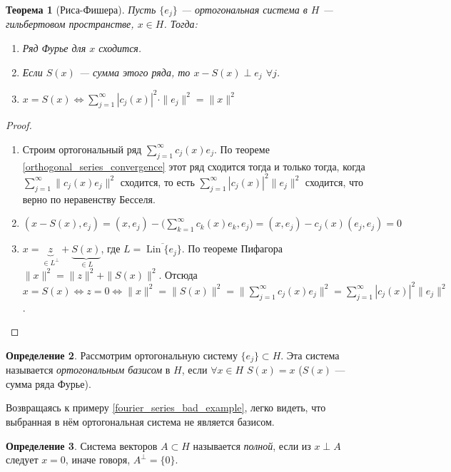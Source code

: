 \documentclass[11pt,openany,a4paper]{scrartcl}
\theoremstyle{plain}
\newtheorem{theorem}{Теорема}[subsection]
\theoremstyle{definition}
\newtheorem{definition}[theorem]{Определение}
\newcommand\ol{\overline}
\DeclareMathOperator{\Lin}{Lin}
\begin{document}
\begin{theorem}[Риса-Фишера]
    Пусть $\{e_j\}$ — ортогональная система в $H$ — гильбертовом пространстве,
    $x \in H$. Тогда:
    \begin{enumerate}
        \item Ряд Фурье для $x$ сходится.
        \item Если $S(x)$ — сумма этого ряда, то $x - S(x) \perp e_j$ $\forall j$.
        \item $x = S(x) \iff \sum\limits_{j=1}^\infty |c_j(x)|^2\cdot\|e_j\|^2 =
        \|x\|^2$
    \end{enumerate}
\end{theorem}
\begin{proof}
    \begin{enumerate}
        \item Строим ортогональный ряд $\sum\limits_{j=1}^\infty c_j(x)e_j$. По 
        теореме \ref{orthogonal_series_convergence} этот ряд сходится тогда и 
        только тогда, когда $\sum\limits_{j=1}^\infty \|c_j(x)e_j\|^2$
        сходится, то 
        есть $\sum\limits_{j=1}^\infty |c_j(x)|^2\|e_j\|^2$ сходится, что верно по 
        неравенству Бесселя.
        \item $(x - S(x), e_j) = (x, e_j) -
        \bigg(\sum\limits_{k=1}^\infty c_k(x)e_k, e_j\bigg) = (x, e_j) - c_j(x)(e_j, e_j) = 
        0$
        \item $x = \underbrace{z}_{\in L^\perp} + \underbrace{S(x)}_{\in L}$, где
        $L = \ol{\Lin\{e_j\}}$. По теореме Пифагора
        $\|x\|^2 = \|z\|^2 + \|S(x)\|^2$. Отсюда $x = S(x) \iff z = 0 \iff
        \|x\|^2 = \|S(x)\|^2 = \bigg\|\sum\limits_{j=1}^\infty c_j(x) e_j\bigg\|^2 =
        \sum\limits_{j=1}^\infty |c_j(x)|^2\|e_j\|^2$.
    \end{enumerate}
\end{proof}

\begin{definition}
    Рассмотрим ортогональную систему $\{e_j\} \subset H$. Эта система называется
    \emph{ортогональным базисом} в $H$, если $\forall x \in H$ $S(x) = x$ ($S(x)$ —
    сумма ряда Фурье).
\end{definition}

Возвращаясь к примеру \ref{fourier_series_bad_example}, легко видеть, что 
выбранная в нём ортогональная система не является базисом.

\begin{definition}
    Система векторов $A \subset H$ называется \emph{полной}, если из $x \perp A$
    следует $x = 0$, иначе говоря, $A^\perp = \{0\}$.
\end{definition}
\end{document}

